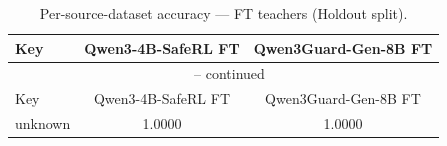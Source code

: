 \begin{landscape}
\begin{longtable}{lcc}
\caption{Per-source-dataset accuracy — FT teachers (Holdout split).} \\
\label{tab:ft_teachers_per_dataset_holdout}
\toprule
Key & Qwen3-4B-SafeRL FT & Qwen3Guard-Gen-8B FT \\
\midrule
\endfirsthead
\multicolumn{3}{c}{\tablename\ \thetable{} -- continued} \\
\toprule
Key & Qwen3-4B-SafeRL FT & Qwen3Guard-Gen-8B FT \\
\midrule
\endhead
unknown & 1.0000 & 1.0000 \\
\bottomrule
\end{longtable}
\end{landscape}